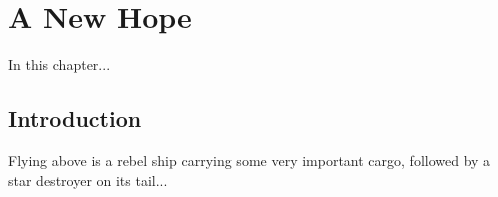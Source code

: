 
\chapter{A New Hope}
	\label{chapter:a-new-hope}



\begin{synopsis}
	In this chapter...
\end{synopsis}


\section{Introduction}

Flying above is a rebel ship carrying some very important cargo, followed by a star destroyer on its tail...


